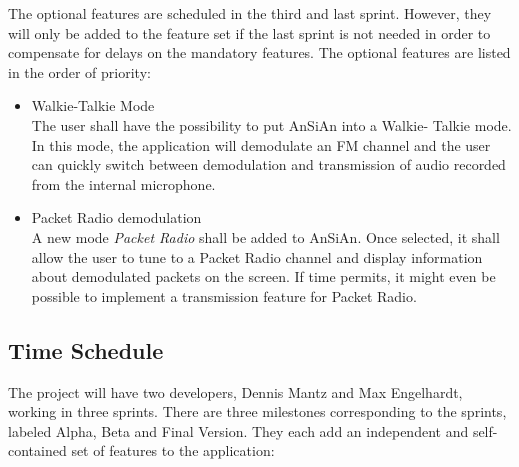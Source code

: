 The optional features are scheduled in the third and last sprint. However,
they will only be added to the feature set if the last sprint is not needed
in order to compensate for delays on the mandatory features. The optional features are
listed in the order of priority:
\begin{itemize}
	\item Walkie-Talkie Mode \\
		The user shall have the possibility to put \ac{AnSiAn} into a Walkie-
		Talkie mode. In this mode, the application will demodulate an FM channel
		and the user can quickly switch between demodulation and transmission
		of audio recorded from the internal microphone.
	\item Packet Radio demodulation\\
		A new mode \emph{Packet Radio} shall be added to \ac{AnSiAn}. Once selected, it shall allow the user
		to tune to a Packet Radio channel and display information about 
		demodulated packets on the screen. If time permits, it might even
		be possible to implement a transmission feature for Packet Radio.
\end{itemize}


\subsection{Time Schedule}
\label{sec:time_schedule}

The project will have two developers, Dennis Mantz and Max Engelhardt,
working in three sprints. There are three milestones corresponding to
the sprints, labeled Alpha, Beta and Final Version. They each add an independent
and self-contained set of features to the application:

